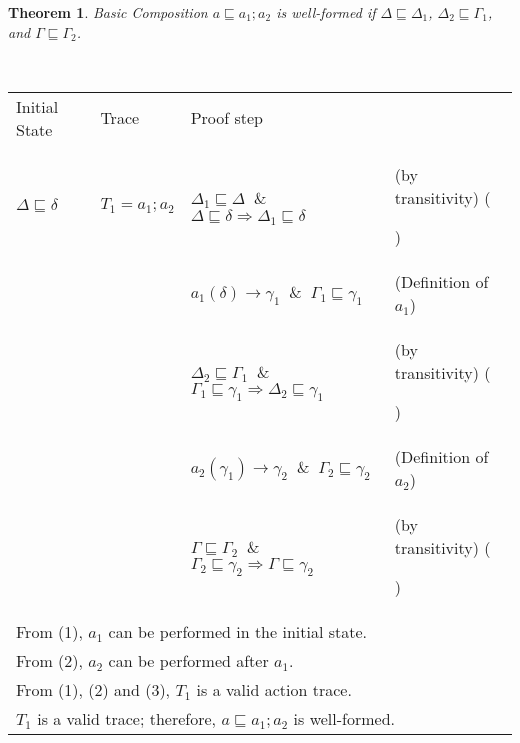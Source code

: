 \documentclass[12pt,journal,letterpaper,onecolumn]{IEEEtran}
\newcounter{myCounter}
\renewcommand{\themyCounter}{\arabic{myCounter}\addtocounter{myCounter}{1}}
\newtheorem{theorem}{Theorem}[section]
\begin{document}
\begin{theorem}
Basic Composition $a\sqsubseteq a_1;a_2$ is well-formed if $\Delta
\sqsubseteq \Delta_1$, $\Delta_2\sqsubseteq \Gamma_1$, and $\Gamma
\sqsubseteq \Gamma_2$.\label{theorem:basic}
\end{theorem}
\\
\begin{minipage}{6in} \begin{center}
\begin{tabular}{llp{7.5cm}p{3.8cm}}
Initial State & Trace &  Proof step & \\
$\Delta \sqsubseteq \delta$ & $T_1 = a_1;a_2$ & $\Delta_1 \sqsubseteq \Delta $ $~\&~$ $ \Delta \sqsubseteq \delta \Rightarrow \Delta_1 \sqsubseteq \delta$ & (by transitivity)  \hfill(\themyCounter)\\
& & $a_1(\delta)\rightarrow \gamma_1 $ $~\&~$ $ \Gamma_1 \sqsubseteq \gamma_1$ & (Definition of $a_1$)\\
& & $\Delta_2 \sqsubseteq \Gamma_1 $ $~\&~$ $ \Gamma_1 \sqsubseteq \gamma_1 \Rightarrow \Delta_2 \sqsubseteq \gamma_1$ & (by transitivity) \hfill(\themyCounter)\\
& & $a_2(\gamma_1)\rightarrow \gamma_2 $ $~\&~$ $ \Gamma_2 \sqsubseteq \gamma_2$ & (Definition of $a_2$)\\
& & $\Gamma \sqsubseteq \Gamma_2 $ $~\&~$ $ \Gamma_2 \sqsubseteq \gamma_2 \Rightarrow \Gamma \sqsubseteq \gamma_2$ & (by transitivity) \hfill(\themyCounter)\\
\multicolumn{4}{l}{From (1), $a_1$ can be performed in the initial state.}\\
\multicolumn{4}{l}{From (2), $a_2$ can be performed after $a_1$.}\\
\multicolumn{4}{l}{From (1), (2) and (3), $T_1$ is a valid action trace.}\\
\multicolumn{4}{l}{$T_1$ is a valid trace; therefore, $a\sqsubseteq a_1;a_2$ is well-formed.}\hfill$\Box$\\
\end{tabular}
\end{center}
\end{minipage}\\
\end{document}
